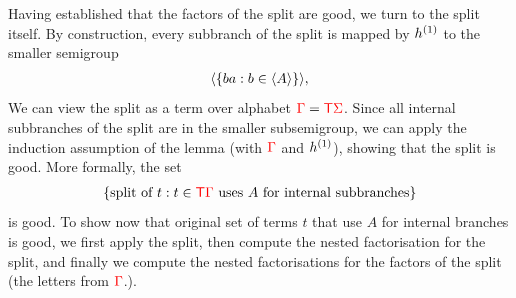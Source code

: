 \begin{itemize}
        Having established that the factors of the split are good, we turn to the split itself. By construction, every subbranch of the split is mapped by $\hb 1 h$ to the smaller semigroup 
        \begin{align*}
            \subgen{\set{ b a :  b \in \subgen A}},
       \end{align*}
       We can  view the  split as a term over alphabet $\rGamma = \tmonad \rSigma$.  Since all  internal subbranches of the split are in the smaller subsemigroup, we can apply the induction assumption of the lemma (with $\rGamma$ and $\hb 1 h$), showing that the split is good. More formally, the set 
       \begin{align*}
       \set{\text{split of $t$} : t \in \tmonad  \rGamma \text{ uses $A$ for internal subbranches}}
       \end{align*}
       is good. To show now that original set of terms $t$ that use $A$ for  internal branches is good, we first apply the split, then compute the nested factorisation for the split, and finally we compute the nested factorisations for the factors of the split (the letters from $\rGamma$.). 
\end{itemize}


    
